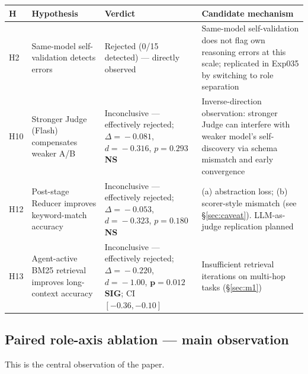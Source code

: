 \documentclass[11pt]{article}
\newcommand{\sig}{\textbf{SIG}}
\newcommand{\NS}{\textbf{NS}}
\begin{document}
\begin{table}[h]
\centering
\footnotesize
\begin{tabular}{@{}p{}p{}p{}p{}@{}}
\toprule
H & Hypothesis & Verdict & Candidate mechanism \\
\midrule
H2 & Same-model self-validation detects errors & Rejected (0/15 detected) --- directly observed & Same-model self-validation does not flag own reasoning errors at this scale; replicated in Exp035 by switching to role separation \\
H10 & Stronger Judge (Flash) compensates weaker A/B & Inconclusive --- effectively rejected; $\Delta\!=\!-0.081$, $d\!=\!-0.316$, $p\!=\!0.293$ \NS{} & Inverse-direction observation: stronger Judge can interfere with weaker model's self-discovery via schema mismatch and early convergence \\
H12 & Post-stage Reducer improves keyword-match accuracy & Inconclusive --- effectively rejected; $\Delta\!=\!-0.053$, $d\!=\!-0.323$, $p\!=\!0.180$ \NS{} & (a) abstraction loss; (b) scorer-style mismatch (see \S\ref{sec:caveat}). LLM-as-judge replication planned \\
H13 & Agent-active BM25 retrieval improves long-context accuracy & Inconclusive --- effectively rejected; $\Delta\!=\!-0.220$, $d\!=\!-1.00$, $\mathbf{p\!=\!0.012}$ \sig; CI $[-0.36, -0.10]$ & Insufficient retrieval iterations on multi-hop tasks (\S\ref{sec:m1}) \\
\bottomrule
\end{tabular}
\end{table}

\subsection{Paired role-axis ablation --- main observation}\label{sec:position}

This is the central observation of the paper.
\end{document}
